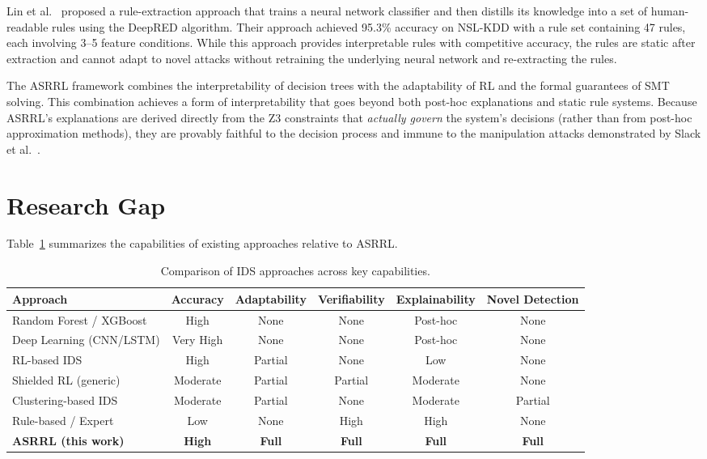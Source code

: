 \documentclass[12pt, letterpaper, oneside]{report}
\newcommand{\ASRRL}{\textsc{ASRRL}}
\begin{document}
Lin et al.~\cite{lin2022} proposed a rule-extraction approach that trains a neural network classifier and then distills its knowledge into a set of human-readable rules using the DeepRED algorithm. Their approach achieved 95.3\% accuracy on NSL-KDD with a rule set containing 47 rules, each involving 3--5 feature conditions. While this approach provides interpretable rules with competitive accuracy, the rules are static after extraction and cannot adapt to novel attacks without retraining the underlying neural network and re-extracting the rules.

The \ASRRL{} framework combines the interpretability of decision trees with the adaptability of RL and the formal guarantees of SMT solving. This combination achieves a form of interpretability that goes beyond both post-hoc explanations and static rule systems. Because \ASRRL{}'s explanations are derived directly from the Z3 constraints that \emph{actually govern} the system's decisions (rather than from post-hoc approximation methods), they are provably faithful to the decision process and immune to the manipulation attacks demonstrated by Slack et al.~\cite{slack2020}.


\section{Research Gap}
\label{sec:lit_gap}

Table~\ref{tab:lit_comparison} summarizes the capabilities of existing approaches relative to \ASRRL{}.

\begin{table}[htbp]
\centering
\caption{Comparison of IDS approaches across key capabilities.}
\label{tab:lit_comparison}
\small
\begin{tabular}{lccccc}
\toprule
\textbf{Approach} & \textbf{Accuracy} & \textbf{Adaptability} & \textbf{Verifiability} & \textbf{Explainability} & \textbf{Novel Detection} \\
\midrule
Random Forest / XGBoost & High & None & None & Post-hoc & None \\
Deep Learning (CNN/LSTM) & Very High & None & None & Post-hoc & None \\
RL-based IDS & High & Partial & None & Low & None \\
Shielded RL (generic) & Moderate & Partial & Partial & Moderate & None \\
Clustering-based IDS & Moderate & Partial & None & Moderate & Partial \\
Rule-based / Expert & Low & None & High & High & None \\
\midrule
\textbf{ASRRL (this work)} & \textbf{High} & \textbf{Full} & \textbf{Full} & \textbf{Full} & \textbf{Full} \\
\bottomrule
\end{tabular}
\end{table}
\end{document}
